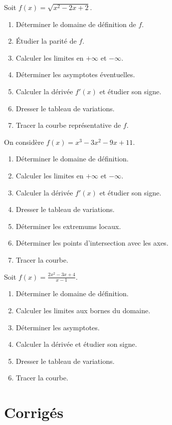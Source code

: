 Soit \(f(x)=\sqrt{x^2-2x+2}\).
\begin{enumerate}[label=\arabic*)]
\item Déterminer le domaine de définition de \(f\).
\item Étudier la parité de \(f\).
\item Calculer les limites en \(+\infty\) et \(-\infty\).
\item Déterminer les asymptotes éventuelles.
\item Calculer la dérivée \(f'(x)\) et étudier son signe.
\item Dresser le tableau de variations.
\item Tracer la courbe représentative de \(f\).
\end{enumerate}

On considère \(f(x)=x^3-3x^2-9x+11\).
\begin{enumerate}[label=\arabic*)]
\item Déterminer le domaine de définition.
\item Calculer les limites en \(+\infty\) et \(-\infty\).
\item Calculer la dérivée \(f'(x)\) et étudier son signe.
\item Dresser le tableau de variations.
\item Déterminer les extremums locaux.
\item Déterminer les points d'intersection avec les axes.
\item Tracer la courbe.
\end{enumerate}

Soit \(f(x)=\frac{2x^2-3x+4}{x-1}\).
\begin{enumerate}[label=\arabic*)]
\item Déterminer le domaine de définition.
\item Calculer les limites aux bornes du domaine.
\item Déterminer les asymptotes.
\item Calculer la dérivée et étudier son signe.
\item Dresser le tableau de variations.
\item Tracer la courbe.
\end{enumerate}

\section{Corrigés}

